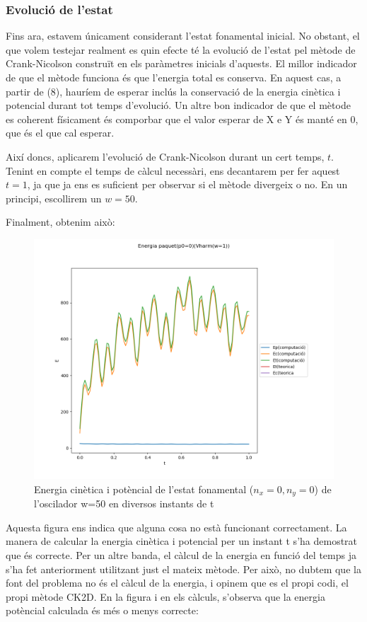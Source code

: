 \documentclass{article}
\begin{document}
\subsubsection{Evolució de l'estat}

Fins ara, estavem únicament considerant l'estat fonamental inicial. No obstant, el que volem testejar
realment es quin efecte té la evolució de l'estat pel mètode de Crank-Nicolson construït en els paràmetres inicials d'aquests. El millor indicador de que el mètode funciona és que l'energia total es conserva. En aquest cas, a partir de (8), hauríem de esperar inclús la conservació de la energia cinètica i potencial durant tot temps d'evolució. Un altre bon indicador de que el mètode es coherent físicament és comporbar que el valor esperar de X e Y és manté en 0, que és el que cal esperar. 

Així doncs, aplicarem l'evolució de Crank-Nicolson durant un cert temps, \(t\). Tenint en compte el temps de càlcul necessàri, ens decantarem per fer aquest \(t=1\), ja que ja ens es suficient per observar si el mètode divergeix o no. En un principi, escollirem un \(w=50\).

Finalment, obtenim això:

\begin{figure}[H]
	\includegraphics[width=\textwidth]{energiaharmdiscretitzat.png}
	\caption{Energia cinètica i potèncial de l'estat fonamental (\(n_x=0,n_y=0\)) de l'oscilador w=50 en diversos instants de t}
\end{figure}

Aquesta figura ens indica que alguna cosa no està funcionant correctament. La manera de calcular la energia cinètica i potencial per un instant t s'ha demostrat que és correcte. Per un altre banda, el càlcul de la energia en funció del temps ja s'ha fet anteriorment utilitzant just el mateix mètode. Per això, no dubtem que la font del problema no és el càlcul de la energia, i opinem que es el propi codi, el propi mètode CK2D. En la figura i en els càlculs, s'observa que la energia potèncial calculada és més o menys correcte:
\end{document}
